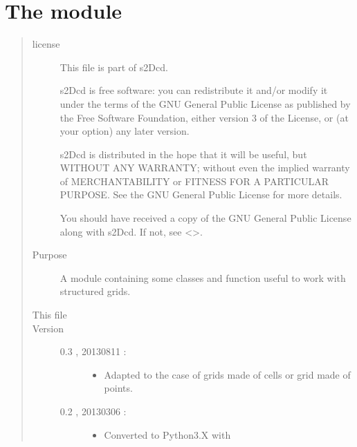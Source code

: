 \documentclass[letterpaper,10pt,english]{sphinxmanual}
\begin{document}
\section{The  module}
\label{\detokenize{appendices:module-s2Dcd.grid}}\label{\detokenize{appendices:the-s2dcd-grid-module}}\begin{quote}\begin{description}
\item[{license}] \leavevmode
This file is part of s2Dcd.

s2Dcd is free software: you can redistribute it and/or modify
it under the terms of the GNU General Public License as published by
the Free Software Foundation, either version 3 of the License, or
(at your option) any later version.

s2Dcd is distributed in the hope that it will be useful,
but WITHOUT ANY WARRANTY; without even the implied warranty of
MERCHANTABILITY or FITNESS FOR A PARTICULAR PURPOSE.  See the
GNU General Public License for more details.

You should have received a copy of the GNU General Public License
along with s2Dcd.  If not, see \textless{}\textgreater{}.

\item[{Purpose}] \leavevmode
A module containing some classes and function useful to work with
structured grids.

\item[{This file}] \leavevmode
{}

\item[{Version}] \leavevmode\begin{description}
\item[{0.3 , 2013\sphinxhyphen{}08\sphinxhyphen{}11 :}] \leavevmode\begin{itemize}
\item {} 
Adapted to the case of grids made of cells or grid made of
points.

\end{itemize}

\item[{0.2 , 2013\sphinxhyphen{}03\sphinxhyphen{}06 :}] \leavevmode\begin{itemize}
\item {} 
Converted to Python3.X with 

\end{itemize}


\end{description}
\end{description}
\end{quote}
\end{document}
